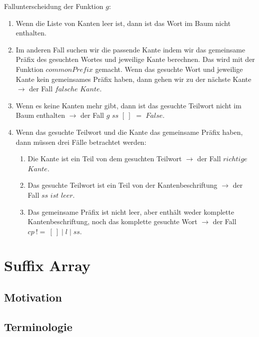 \documentclass[12pt]{report}
\begin{document}
Fallunterscheidung der Funktion $g$:
\begin{enumerate}
    \item Wenn die Liste von Kanten leer ist, dann ist das Wort im Baum nicht enthalten.
    \item Im anderen Fall suchen wir die passende Kante indem wir das gemeinsame Präfix des gesuchten Wortes und jeweilige Kante berechnen. Das wird mit der Funktion $commonPrefix$ gemacht. Wenn das gesuchte Wort und jeweilige Kante kein gemeinsames Präfix haben, dann gehen wir zu der nächste Kante $\rightarrow$ der Fall $falsche$ $Kante$.
    \item Wenn es keine Kanten mehr gibt, dann ist das gesuchte Teilwort nicht im Baum enthalten $\rightarrow$ der Fall $g$ $ss$ $[\:]$ $=$ $False$.
    \item Wenn das gesuchte Teilwort und die Kante das gemeinsame Präfix haben, dann müssen drei Fälle betrachtet werden:
    \begin{enumerate}
        \item Die Kante ist ein Teil von dem gesuchten Teilwort $\rightarrow$ der Fall $richtige$ $Kante$.
        \item Das gesuchte Teilwort ist ein Teil von der Kantenbeschriftung $\rightarrow$ der Fall $ss$ $ist$ $leer$.
        \item Das gemeinsame Präfix ist nicht leer, aber enthält weder komplette Kantenbeschriftung, noch das komplette gesuchte Wort $\rightarrow$ der Fall $cp\:!=\:[\:]\mid l \mid ss$.
    \end{enumerate}
\end{enumerate}

\chapter{Suffix Array}
\label{sec:SuffixArray}

\section{Motivation}
\label{sec:Motivation}

\section{Terminologie}
\label{sec:Terminologie}
\end{document}
